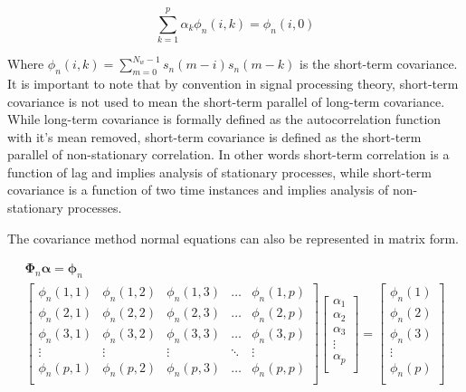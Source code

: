  \begin{equation}
 	\sum_{k=1}^{p} \alpha_k \phi_n(i,k) = \phi_n(i,0)
 \end{equation}
 
 \noindent
 Where $\phi_n(i,k) = \sum_{m=0}^{N_w-1} s_n(m-i) s_n(m-k)$ is the short-term covariance. It is important to note that by convention in signal processing theory, short-term covariance is not used to mean the short-term parallel of long-term covariance. While long-term covariance is formally defined as the autocorrelation function with it's mean removed, short-term covariance is defined as the short-term parallel of non-stationary correlation. In other words short-term correlation is a function of lag and implies analysis of stationary processes, while short-term covariance is a function of two time instances and implies analysis of non-stationary processes.
 
 The covariance method normal equations can also be represented in matrix form.
 
 \begin{eqnarray}
 	\boldsymbol{\Phi}_n \boldsymbol{\alpha} = \boldsymbol{\phi}_n \\
 	\begin{bmatrix} 
 		\phi_n(1,1)   & \phi_n(1,2)   & \phi_n(1,3)     & \dots    & \phi_n(1,p)  \\
 		\phi_n(2,1)   & \phi_n(2,2)  & \phi_n(2,3)     & \dots     & \phi_n(2,p)  \\
 		\phi_n(3,1)   & \phi_n(3,2)  & \phi_n(3,3)     & \dots    & \phi_n(3,p)  \\
 		\vdots      & \vdots      & \vdots          & \ddots  & \vdots  \\
 		\phi_n(p,1)  & \phi_n(p,2)  & \phi_n(p,3)      & \dots    & \phi_n(p,p)  \\
 	\end{bmatrix} 
 	\begin{bmatrix}
 		\alpha_1 \\
 		\alpha_2 \\
 		\alpha_3 \\
 		\vdots    \\
 		\alpha_p \\
 	\end{bmatrix}
 	=
 	\begin{bmatrix}
 		\phi_n(1)  \\
 		\phi_n(2) \\
 		\phi_n(3) \\
 		\vdots    \\
 		\phi_n(p) \\
 	\end{bmatrix}
 \end{eqnarray}
 
